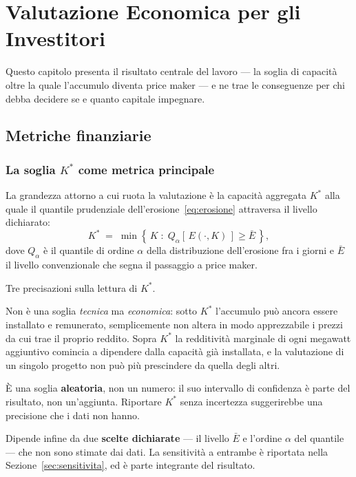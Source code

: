 \chapter{Valutazione Economica per gli Investitori}
\label{cap:valutazione}

Questo capitolo presenta il risultato centrale del lavoro — la soglia di capacit\`a oltre la
quale l'accumulo diventa price maker — e ne trae le conseguenze per chi debba decidere se e
quanto capitale impegnare.

\section{Metriche finanziarie}
\label{sec:metriche}

\subsection{La soglia \texorpdfstring{$K^*$}{K*} come metrica principale}

La grandezza attorno a cui ruota la valutazione \`e la capacit\`a aggregata $K^*$ alla quale
il quantile prudenziale dell'erosione~\eqref{eq:erosione} attraversa il livello dichiarato:
\begin{equation}
K^{*} \;=\; \min \left\{\, K \;:\; Q_{\alpha}\!\left[\,E(\cdot,K)\,\right] \ge \bar{E} \,\right\},
\label{eq:kstella}
\end{equation}
dove $Q_{\alpha}$ \`e il quantile di ordine $\alpha$ della distribuzione dell'erosione fra i
giorni e $\bar{E}$ il livello convenzionale che segna il passaggio a price maker.

Tre precisazioni sulla lettura di $K^*$.

Non \`e una soglia \emph{tecnica} ma \emph{economica}: sotto $K^*$ l'accumulo pu\`o ancora
essere installato e remunerato, semplicemente non altera in modo apprezzabile i prezzi da cui
trae il proprio reddito. Sopra $K^*$ la redditivit\`a marginale di ogni megawatt aggiuntivo
comincia a dipendere dalla capacit\`a gi\`a installata, e la valutazione di un singolo
progetto non pu\`o pi\`u prescindere da quella degli altri.

\`E una soglia \textbf{aleatoria}, non un numero: il suo intervallo di confidenza \`e parte
del risultato, non un'aggiunta. Riportare $K^*$ senza incertezza suggerirebbe una precisione
che i dati non hanno.

Dipende infine da due \textbf{scelte dichiarate} — il livello $\bar{E}$ e l'ordine $\alpha$
del quantile — che non sono stimate dai dati. La sensitivit\`a a entrambe \`e riportata nella
Sezione~\ref{sec:sensitivita}, ed \`e parte integrante del risultato.

